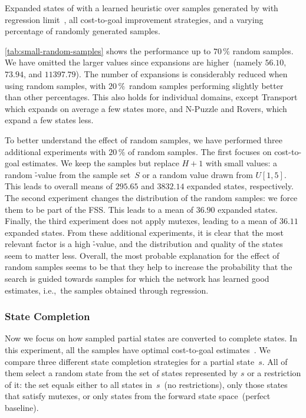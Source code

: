 \begin{table}[ht]
    \caption[Expanded states from a varying percentage of randomly generated samples.]{Expanded states of \gbfs with a learned heuristic over samples generated by \bfsrw with regression limit~\meanfx, all cost-to-goal improvement strategies, and a varying percentage of randomly generated samples.}
    \label{tab:small-random-samples}
    \addmargin
    \centering
    
\end{table}

\cref{tab:small-random-samples} shows the performance up to $70\,\%$ random samples. We have omitted the larger values since expansions are higher~(namely $56.10$, $73.94$, and $11397.79$). The number of expansions is considerably reduced when using random samples, with $20\,\%$~random samples performing slightly better than other percentages. This also holds for individual domains, except Transport which expands on average a few states more, and N-Puzzle and Rovers, which expand a few states less.

To better understand the effect of random samples, we have performed three additional experiments with $20\,\%$ of random samples. The first focuses on cost-to-goal estimates. We keep the samples but replace $H+1$ with small values: a random \h-value from the sample set~$S$ or a random value drawn from $U[1,5]$. This leads to overall means of $295.65$ and $3832.14$ expanded states, respectively. The second experiment changes the distribution of the random samples: we force them to be part of the FSS. This leads to a mean of $36.90$ expanded states. Finally, the third experiment does not apply mutexes, leading to a mean of $36.11$ expanded states. From these additional experiments, it is clear that the most relevant factor is a high \h-value, and the distribution and quality of the states seem to matter less. Overall, the most probable explanation for the effect of random samples seems to be that they help to increase the probability that the search is guided towards samples for which the network has learned good estimates, i.e.,~the samples obtained through regression.

\subsubsection{State Completion}
\label{sec:small-exps-state-completion}

Now we focus on how sampled partial states are converted to complete states. In this experiment, all the samples have optimal cost-to-goal estimates~\hstar. We compare three different state completion strategies for a partial state~$s$. All of them select a random state from the set of states represented by $s$ or a restriction of it: the set equals either to all states in~$s$~(no restrictions), only those states that satisfy mutexes, or only states from the forward state space~(perfect baseline).

